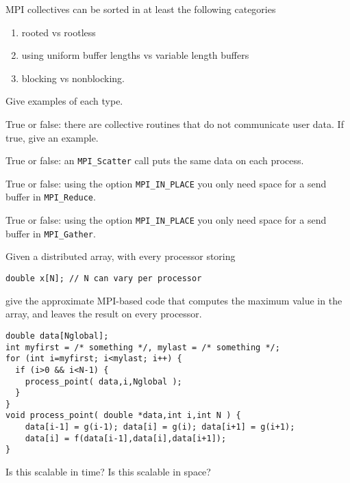 \begin{review}
  MPI collectives can be sorted in at least the following categories
  \begin{enumerate}
  \item rooted vs rootless
  \item using uniform buffer lengths vs variable length buffers
  \item blocking vs nonblocking.
  \end{enumerate}
  Give examples of each type.  
\end{review}

\begin{review}
  True or false: there are collective routines that do not
  communicate user data. If true, give an example.
\end{review}

\begin{review}
  True or false: an \lstinline{MPI_Scatter} call puts the same data on
  each process.
\end{review}

\begin{review}
  True or false: using the option \lstinline{MPI_IN_PLACE} you
  only need space for a send buffer in \lstinline{MPI_Reduce}.
\end{review}

\begin{review}
  True or false: using the option \lstinline{MPI_IN_PLACE} you
  only need space for a send buffer in \lstinline{MPI_Gather}.
\end{review}

\begin{review}
  Given a distributed array, with every processor storing
\begin{lstlisting}
double x[N]; // N can vary per processor
\end{lstlisting}
  give the approximate MPI-based code that computes the maximum value
  in the array, and leaves the result on every processor.
\end{review}


\begin{review}
\begin{lstlisting}
double data[Nglobal];
int myfirst = /* something */, mylast = /* something */;
for (int i=myfirst; i<mylast; i++) {
  if (i>0 && i<N-1) {
    process_point( data,i,Nglobal );
  }
}
void process_point( double *data,int i,int N ) {
    data[i-1] = g(i-1); data[i] = g(i); data[i+1] = g(i+1);
    data[i] = f(data[i-1],data[i],data[i+1]); 
}
\end{lstlisting}
Is this scalable in time? Is this scalable in space?
\end{review}

